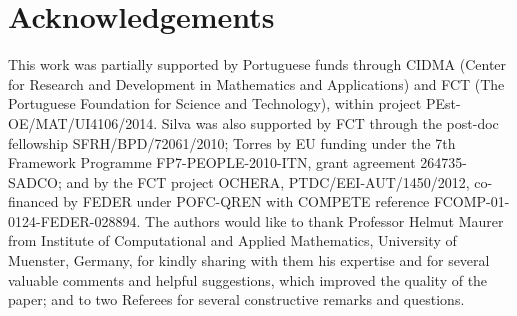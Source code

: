 \documentclass{my_aims}
\theoremstyle{definition}
\begin{document}
\section*{Acknowledgements}

This work was partially supported by Portuguese funds through CIDMA
(Center for Research and Development in Mathematics and Applications)
and FCT (The Portuguese Foundation for Science and Technology),
within project PEst-OE/MAT/UI4106/2014.
Silva was also supported by FCT through the post-doc fellowship
SFRH/BPD/72061/2010; Torres by EU funding under
the 7th Framework Programme FP7-PEOPLE-2010-ITN, grant agreement 264735-SADCO;
and by the FCT project OCHERA, PTDC/EEI-AUT/1450/2012, co-financed by
FEDER under POFC-QREN with COMPETE reference FCOMP-01-0124-FEDER-028894.
The authors would like to thank Professor Helmut Maurer from
Institute of Computational and Applied Mathematics, University of Muenster,
Germany, for kindly sharing with them his expertise and for several valuable
comments and helpful suggestions, which improved the quality of the paper;
and to two Referees for several constructive remarks and questions.
\end{document}
